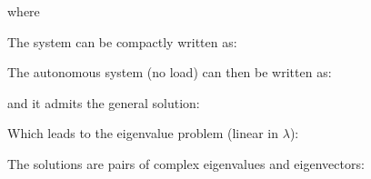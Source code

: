 \documentclass[10pt,a4paper]{scrartcl}
\begin{document}
\begin{multicols*}{2}

where


The system can be compactly written as:


The autonomous system (no load) can then be written as:


and it admits the general solution:


Which leads to the eigenvalue problem (linear in $\lambda$):


The solutions are pairs of complex eigenvalues and eigenvectors:


\end{multicols*}
\end{document}
